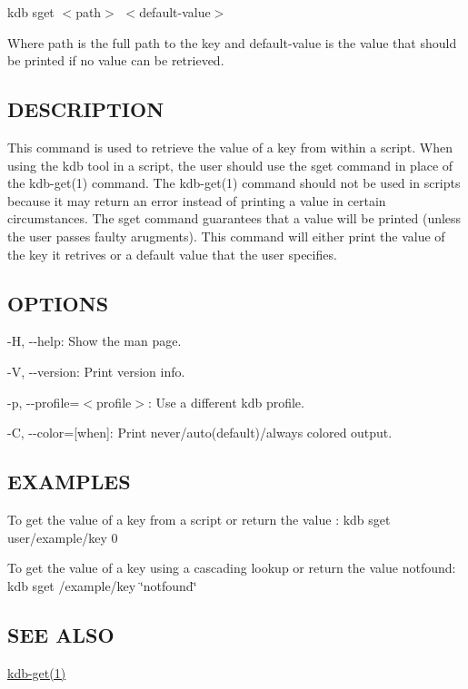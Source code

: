 {\ttfamily kdb sget $<$path$>$ $<$default-\/value$>$}

Where {\ttfamily path} is the full path to the key and {\ttfamily default-\/value} is the value that should be printed if no value can be retrieved.

\subsection*{D\+E\+S\+C\+R\+I\+P\+T\+I\+O\+N}

This command is used to retrieve the value of a key from within a script. When using the kdb tool in a script, the user should use the {\ttfamily sget} command in place of the kdb-\/get(1) command. The kdb-\/get(1) command should not be used in scripts because it may return an error instead of printing a value in certain circumstances. The {\ttfamily sget} command guarantees that a value will be printed (unless the user passes faulty arugments). This command will either print the value of the key it retrives or a default value that the user specifies.

\subsection*{O\+P\+T\+I\+O\+N\+S}


\begin{DoxyItemize}
\item {\ttfamily -\/\+H}, {\ttfamily -\/-\/help}\+: Show the man page.
\item {\ttfamily -\/\+V}, {\ttfamily -\/-\/version}\+: Print version info.
\item {\ttfamily -\/p}, {\ttfamily -\/-\/profile}=$<$profile$>$\+: Use a different kdb profile.
\item {\ttfamily -\/\+C}, {\ttfamily -\/-\/color}=\mbox{[}when\mbox{]}\+: Print never/auto(default)/always colored output.
\end{DoxyItemize}

\subsection*{E\+X\+A\+M\+P\+L\+E\+S}

To get the value of a key from a script or return the value {}\+: {\ttfamily kdb sget user/example/key 0}

To get the value of a key using a cascading lookup or return the value {\ttfamily notfound}\+: {\ttfamily kdb sget /example/key \char`\"{}notfound\char`\"{}}

\subsection*{S\+E\+E A\+L\+S\+O}


\begin{DoxyItemize}
\item \hyperlink{md_doc_help_kdb-get_doc_help_kdb-get_md}{kdb-\/get(1)} 
\end{DoxyItemize}